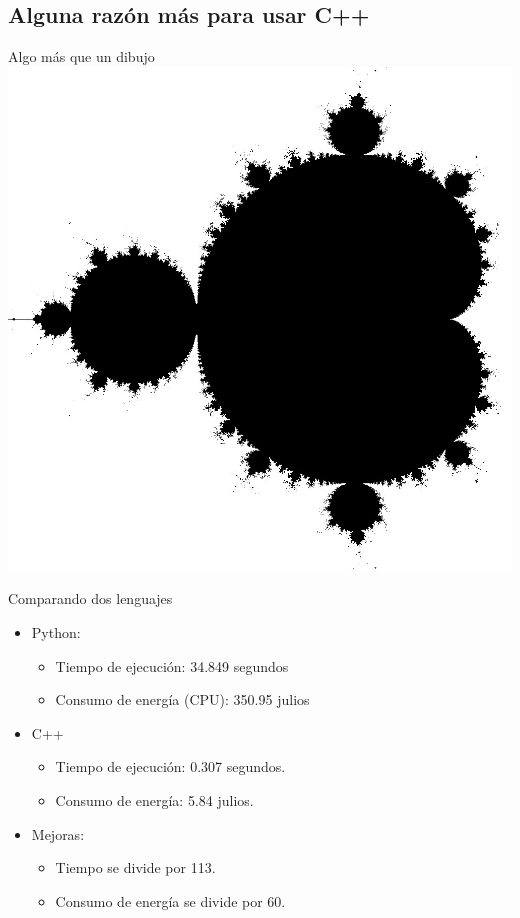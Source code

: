 \subsection{Alguna razón más para usar C++}

\begin{frame}[t]{Algo más que un dibujo}
\centering
\vspace{-.8em}
\includegraphics[height=.9\textheight]{img/mandel.jpg}
\end{frame}

\begin{frame}[t]{Comparando dos lenguajes}
\begin{itemize}
  \item Python:
    \begin{itemize}
      \item Tiempo de ejecución: 34.849 segundos
      \item Consumo de energía (CPU): 350.95 julios
    \end{itemize}

  \vfill\pause
  \item C++
    \begin{itemize}
      \item Tiempo de ejecución: 0.307 segundos.
      \item Consumo de energía: 5.84 julios.
    \end{itemize}

  \vfill\pause
  \item Mejoras:
    \begin{itemize}
      \item Tiempo se divide por 113.
      \item Consumo de energía se divide por 60.
    \end{itemize}
\end{itemize}
\end{frame}

